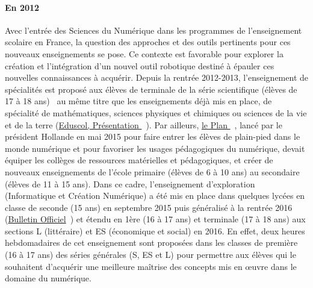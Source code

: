         \paragraph{En 2012}
            Avec l’entrée des Sciences du Numérique dans les programmes de l'enseignement scolaire en France, la question des approches et des outils pertinents pour ces nouveaux enseignements se pose. 
            Ce contexte est favorable pour explorer la création et l’intégration d’un nouvel outil robotique destiné à épauler ces nouvelles connaissances à acquérir.
            Depuis la rentrée 2012-2013, l'enseignement de spécialités  est proposé aux élèves de terminale de la série scientifique (élèves de 17 à 18 ans)~ au même titre que les enseignements déjà mis en place, de spécialité de mathématiques, sciences physiques et chimiques ou sciences de la vie et de la terre (\cf \href{http://eduscol.Éducation.fr/cid59678/presentation.html}{Eduscol, Pr{\'e}sentation }~).
            Par ailleurs, \href{http://www.Éducation.gouv.fr/pid285/bulletin_officiel.html?cid_bo=100720}{le Plan }~, lancé par le président Hollande en mai 2015 pour faire entrer les élèves de plain-pied dans le monde numérique et pour favoriser les usages pédagogiques du numérique, devait équiper les collèges de ressources matérielles et pédagogiques, et créer de nouveaux enseignements de l'école primaire (élèves de 6 à 10 ans) au secondaire (élèves de 11 à 15 ans). Dans ce cadre, l'enseignement d'exploration  (Informatique et Création Numérique) a été mis en place dans quelques lycées en classe de seconde (15 ans) en septembre 2015 puis généralisé à la rentrée 2016 (\cf \href{http://www.Éducation.gouv.fr/pid285/bulletin_officiel.html?cid_bo=100720}{Bulletin Officiel}~) et étendu en 1ère (16 à 17 ans) et terminale (17 à 18 ans) aux sections L (littéraire) et ES (économique et social) en 2016. En effet, deux heures hebdomadaires de cet enseignement sont proposées dans les classes de première (16 à 17 ans) des séries générales (S, ES et L) pour permettre aux élèves qui le souhaitent d'acquérir une meilleure maîtrise des concepts mis en œuvre dans le domaine du numérique.
